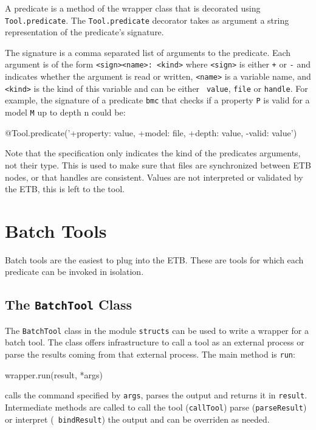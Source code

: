\documentclass{article}
\begin{document}
A predicate is a method of the wrapper class that is decorated using
{\tt Tool.predicate}. The {\tt Tool.predicate} decorator takes as
argument a string representation of the predicate's signature.

The signature is a comma separated list of arguments to the
predicate. Each argument is of the form {\tt <sign><name>: <kind>}
where {\tt <sign>} is either {\tt +} or {\tt -} and indicates whether
the argument is read or written, {\tt <name>} is a variable name, and
{\tt <kind>} is the kind of this variable and can be either {\tt
  value}, {\tt file} or {\tt handle}. For example, the signature of a
predicate {\tt bmc} that checks if a property {\tt P} is valid for a
model {\tt M} up to depth {n} could be:
\begin{pythoncode}
@Tool.predicate('+property: value, +model: file, +depth: value,
                 -valid: value')
\end{pythoncode}
Note that the specification only indicates the kind of the predicates
arguments, not their type. This is used to make sure that files are
synchronized between ETB nodes, or that handles are consistent. Values
are not interpreted or validated by the ETB, this is left to the tool.

\section{Batch Tools}

Batch tools are the easiest to plug into the ETB. These are tools for
which each predicate can be invoked in isolation.

\subsection{The {\tt BatchTool} Class}

The {\tt BatchTool} class in the module {\tt structs} can be used to
write a wrapper for a batch tool. The class offers infrastructure to
call a tool as an external process or parse the results coming from
that external process. The main method is {\tt run}:
\begin{pythoncode}
  wrapper.run(result, *args)
\end{pythoncode}
calls the command specified by {\tt *args}, parses the output and
returns it in {\tt result}. Intermediate methods are called to call
the tool ({\tt callTool}) parse ({\tt parseResult}) or interpret ({\tt
  bindResult}) the output and can be overriden as needed.
\end{document}
